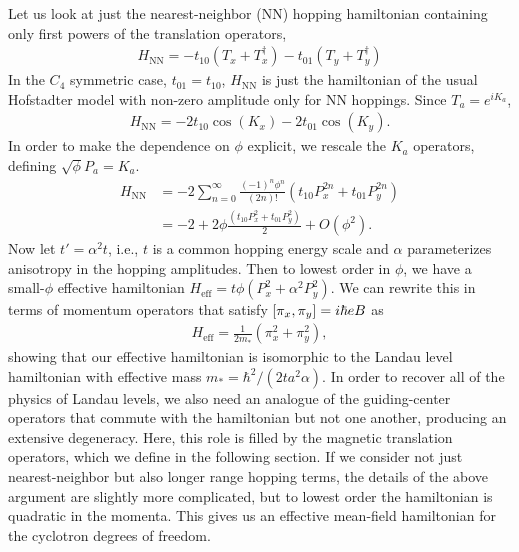\documentclass[aps,prb,twocolumn,letterpaper,twoside,nobalancelastpage,groupedaddress,amsmath,amssymb,floatfix,citeautoscript]{revtex4-1}
\begin{document}
Let us look at just the nearest-neighbor (NN) hopping hamiltonian containing only first powers of the translation operators,
\begin{align*}
H_{\text{NN}} = -t_{10}\left(T_x + T_x^{\dag}\right) - t_{01}\left(T_y + T_y^{\dag}\right)
\end{align*}
In the $C_4$ symmetric case, $t_{01} = t_{10}$, $H_{\text{NN}}$ is just the hamiltonian of the usual Hofstadter model with non-zero amplitude only for NN hoppings. Since $T_a = e^{iK_a}$,
\begin{align*}
H_{\text{NN}}= -2t_{10}\cos\left(K_x\right) - 2 t_{01}\cos\left(K_y\right).
\end{align*}
In order to make the dependence on $\phi$ explicit, we rescale the $K_a$ operators, defining $\sqrt{\phi} P_a = K_a$. 
\begin{align*}
H_{\text{NN}} &= -2\sum_{n=0}^{\infty}  \frac{(-1)^{n}\phi^{n}}{(2n)!} \left(t_{10} P^{2n}_x + t_{01}P^{2n}_y\right)\\
&= -2 + 2\phi\frac{\left(t_{10} P^{2}_x + t_{01} P^{2}_y\right)}{2} +O(\phi^2).
\end{align*}
Now let $t' = \alpha^2 t$, i.e., $t$ is a common hopping energy scale and $\alpha$ parameterizes anisotropy in the hopping amplitudes. Then to lowest order in $\phi$, we have a small-$\phi$ effective hamiltonian $H_{\text{eff}}= t\phi \left(P^{2}_x + \alpha^2P^{2}_y\right)$. We can rewrite this in terms of momentum operators that satisfy $\comm{\pi_x}{\pi_y} = i\hbar e B$ as
\begin{align*}
H_{\text{eff}} = \frac{1}{2m_{\ast}}\left(\pi_x^2 + \pi_y^2\right),
\end{align*}
showing that our effective hamiltonian is isomorphic to the Landau level hamiltonian with effective mass $m_{\ast} = \hbar^2/(2ta^2\alpha)$. In order to recover all of the physics of Landau levels, we also need an analogue of the guiding-center operators that commute with the hamiltonian but not one another, producing an extensive degeneracy. Here, this role is filled by the magnetic translation operators, which we define in the following section. If we consider not just nearest-neighbor but also longer range hopping terms, the details of the above argument are slightly more complicated, but to lowest order the hamiltonian is quadratic in the momenta. This gives us an effective mean-field hamiltonian for the cyclotron degrees of freedom. 
\end{document}
